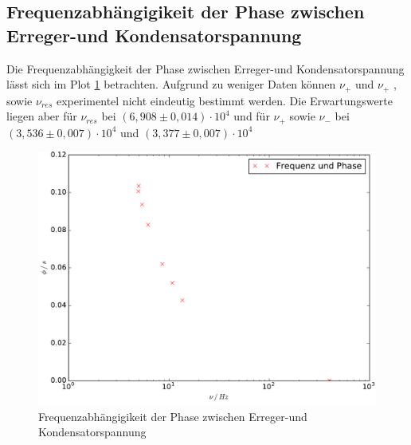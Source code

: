   \subsection{Frequenzabhängigikeit der Phase zwischen Erreger-und Kondensatorspannung}
  Die Frequenzabhängigkeit der Phase zwischen Erreger-und Kondensatorspannung
   lässt sich im Plot \ref{fig:5dplot} betrachten.
  Aufgrund zu weniger Daten können $\nu_+$ und $\nu_+$ , sowie $\nu_{res}$
  experimentel nicht eindeutig bestimmt werden.
  Die Erwartungswerte liegen aber für $\nu_{res}$ bei $(6,908 \pm 0,014)\cdot10^4$
  und für $\nu_+$ sowie $\nu_-$ bei
  $(3,536 \pm 0,007)\cdot10^4$ und $(3,377 \pm 0,007)\cdot10^4$
    \begin{figure}
      \centering
      \includegraphics[width=\textwidth]{./logos/5dplot.pdf}
        \caption{Frequenzabhängigikeit der Phase zwischen Erreger-und Kondensatorspannung}
        \label{fig:5dplot}
      \end{figure}
